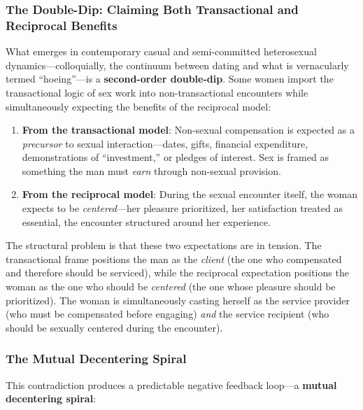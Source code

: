 \documentclass[12pt, letterpaper]{article}
\begin{document}
\subsubsection{The Double-Dip: Claiming Both Transactional and Reciprocal Benefits}

What emerges in contemporary casual and semi-committed heterosexual dynamics---colloquially, the continuum between dating and what is vernacularly termed ``hoeing''---is a \textbf{second-order double-dip}. Some women import the transactional logic of sex work into non-transactional encounters while simultaneously expecting the benefits of the reciprocal model:

\begin{enumerate}
    \item \textbf{From the transactional model}: Non-sexual compensation is expected as a \textit{precursor} to sexual interaction---dates, gifts, financial expenditure, demonstrations of ``investment,'' or pledges of interest. Sex is framed as something the man must \textit{earn} through non-sexual provision.
    
    \item \textbf{From the reciprocal model}: During the sexual encounter itself, the woman expects to be \textit{centered}---her pleasure prioritized, her satisfaction treated as essential, the encounter structured around her experience.
\end{enumerate}

The structural problem is that these two expectations are in tension. The transactional frame positions the man as the \textit{client} (the one who compensated and therefore should be serviced), while the reciprocal expectation positions the woman as the one who should be \textit{centered} (the one whose pleasure should be prioritized). The woman is simultaneously casting herself as the service provider (who must be compensated before engaging) \textit{and} the service recipient (who should be sexually centered during the encounter).

\subsubsection{The Mutual Decentering Spiral}

This contradiction produces a predictable negative feedback loop---a \textbf{mutual decentering spiral}:
\end{document}
